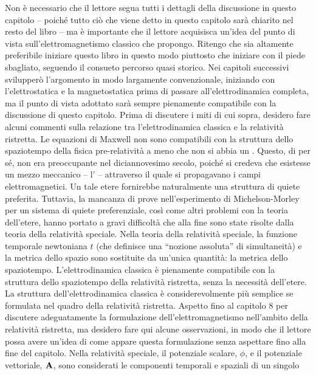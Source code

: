 Non è necessario che il lettore segua tutti i dettagli della discussione in questo capitolo -- poiché tutto ciò che viene detto in questo capitolo sarà chiarito nel resto del libro -- ma è importante che il lettore acquisisca un’idea del punto di vista sull’elettromagnetismo classico che propongo. Ritengo che sia altamente preferibile iniziare questo libro in questo modo piuttosto che iniziare con il piede sbagliato, seguendo il consueto percorso quasi storico. Nei capitoli successivi svilupperò l'argomento in modo largamente convenzionale, iniziando con l'elettrostatica e la magnetostatica prima di passare all'elettrodinamica completa, ma il punto di vista adottato sarà sempre pienamente compatibile con la discussione di questo capitolo. Prima di discutere i miti di cui sopra, desidero fare alcuni commenti sulla relazione tra l’elettrodinamica classica e la relatività ristretta. Le equazioni di Maxwell non sono compatibili con la struttura dello spaziotempo della fisica pre-relatività a meno che non si abbia un . Questo, di per sé, non era preoccupante nel diciannovesimo secolo, poiché si credeva che esistesse un mezzo meccanico – l’ – attraverso il quale si propagavano i campi elettromagnetici. Un tale etere fornirebbe naturalmente una struttura di quiete preferita. Tuttavia, la mancanza di prove nell'esperimento di Michelson-Morley per un sistema di quiete preferenziale, così come altri problemi con la teoria dell'etere, hanno portato a gravi difficoltà che alla fine sono state risolte dalla teoria della relatività speciale. Nella teoria della relatività speciale, la funzione temporale newtoniana $t$ (che definisce una “nozione assoluta” di simultaneità) e la metrica dello spazio sono sostituite da un’unica quantità: la metrica dello spaziotempo. L’elettrodinamica classica è pienamente compatibile con la struttura dello spaziotempo della relatività ristretta, senza la necessità dell’etere. La struttura dell'elettrodinamica classica è considerevolmente più semplice se formulata nel quadro della relatività ristretta. Aspetto fino al capitolo 8 per discutere adeguatamente la formulazione dell'elettromagnetismo nell'ambito della relatività ristretta, ma desidero fare qui alcune osservazioni, in modo che il lettore possa avere un'idea di come appare questa formulazione senza aspettare fino alla fine del capitolo. Nella relatività speciale, il potenziale scalare, $\phi$, e il potenziale vettoriale, $\vb{A}$, sono considerati le componenti temporali e spaziali di un singolo 
